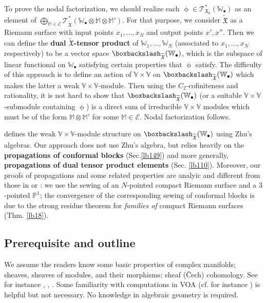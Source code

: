 \documentclass[12pt,a4paper,notitlepage]{report}
\theoremstyle{definition}
\theoremstyle{plain}
\newcommand{\fk}{\mathfrak}
\newcommand{\mc}{\mathcal}
\newcommand{\wtd}{\widetilde}
\newcommand{\scr}{\mathscr}
\newcommand{\blt}{\bullet}
\newcommand{\Vbb}{\mathbb V}
\newcommand{\Wbb}{\mathbb W}
\newcommand{\Mbb}{\mathbb M}
\newcommand{\Pbb}{\mathbb P}
\numberwithin{equation}{section}
\begin{document}
To prove the nodal factorization, we should realize each $\upphi\in\scr T_{\fk X_0}^*(\Wbb_\blt)$ as an element of $\bigoplus_{\Mbb\in\mc E}\scr T_{\wtd{\fk X}}^*(\Wbb_\blt\otimes\Mbb\otimes\Mbb')$. For that purpose, we consider $\wtd{\fk X}$ as a Riemann surface with input points $x_1,\dots,x_N$ and output points $x',x''$.  Then we can define the \textbf{dual $\wtd{\fk X}$-tensor product} of $\Wbb_1,\dots,\Wbb_N$ (associated to $x_1,\dots,x_N$ respectively) to be a vector space $\boxbackslash_{\wtd{\fk X}}(\Wbb_\blt)$, which is the subspace of linear functional on $\Wbb_\blt$ satisfying certain properties that $\upphi$ satisfy. The difficulty of this approach is to define an action of $\Vbb\times\Vbb$ on $\boxbackslash_{\wtd{\fk X}}(\Wbb_\blt)$ which makes the latter a weak $\Vbb\times\Vbb$-module. Then using the $C_2$-cofiniteness and rationality, it is not hard to show that  $\boxbackslash_{\wtd{\fk X}}(\Wbb_\blt)$ (or a suitable $\Vbb\times\Vbb$-submodule containing $\upphi$) is a direct sum of irreducible $\Vbb\times\Vbb$ modules which must be of the form $\Mbb\otimes\Mbb'$ for some $\Mbb\in\mc E$. Nodal factorization follows.

\cite{DGT19b} defines the weak $\Vbb\times\Vbb$-module structure on $\boxbackslash_{\wtd{\fk X}}(\Wbb_\blt)$ using Zhu's algebras. Our approach does not use Zhu's algebra, but relies heavily on the \textbf{propagations of conformal blocks} (Sec.\ref{lb149}) and more generally, \textbf{propagations  of dual tensor product elements} (Sec. \ref{lb110}). Moreover, our proofs of propagations and some related properties are analyic and different from those in \cite{FB04} or \cite{DGT19b}: we use the sewing of an $N$-pointed compact Riemann surface and a $3$-pointed $\Pbb^1$; the convergence of the corresponding sewing of conformal blocks is due to  the strong residue theorem for \emph{families of} compact Riemann surfaces (Thm. \ref{lb18}).




\subsection*{Prerequisite and outline}

We assume the readers know some basic properties of complex manifolds; sheaves,  sheaves of modules, and their morphisms; sheaf (\v Cech) cohomology. See for instance \cite[Sec. 0.2, 0.3]{GH78}, \cite[Chapter B]{Huy06}, \cite[Annex]{GR84}. Some familiarity with computations in VOA (cf. for instance \cite{FHL93}) is helpful but not necessary. No knowledge in algebraic geometry is required.
\end{document}

